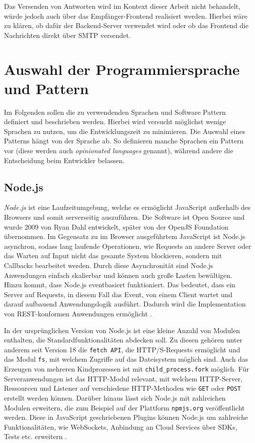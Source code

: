 Das Versenden von Antworten wird im Kontext dieser Arbeit nicht behandelt, würde jedoch auch über das Empfänger-Frontend realisiert werden. Hierbei wäre zu klären, ob dafür der Backend-Server verwendet wird oder ob das Frontend die Nachrichten direkt über SMTP versendet.


\section{Auswahl der Programmiersprache und Pattern}
\label{Auswahl_der_Technologie_und_Designpattern}

Im Folgenden sollen die zu verwendenden Sprachen und Software Pattern definiert und beschrieben werden. Hierbei wird versucht möglichst wenige Sprachen zu nutzen, um die Entwicklungszeit zu minimieren. Die Auswahl eines Patterns hängt von der Sprache ab. So definieren manche Sprachen ein Pattern vor (diese werden auch \textit{opinionated languages} genannt), während andere die Entscheidung beim Entwickler belassen.

\subsection{Node.js}
\label{Node.js}

\textit{Node.js} ist eine Laufzeitumgebung, welche es ermöglicht JavaScript außerhalb des Browsers und somit serverseitig auszuführen. Die Software ist Open Source und wurde 2009 von Ryan Dahl entwickelt, später von der OpenJS Foundation übernommen. Im Gegensatz zu im Browser ausgeführtem JavaScript ist Node.js asynchron, sodass lang laufende Operationen, wie Requests an andere Server oder das Warten auf Input nicht das gesamte System blockieren, sondern mit Callbacks bearbeitet werden. Durch diese Asynchronität sind Node.js Anwendungen einfach skalierbar und können auch große Lasten bewältigen. Hinzu kommt, dass Node.js eventbasiert funktioniert. Das bedeutet, dass ein Server auf Requests, in diesem Fall das Event, von einem Client wartet und darauf aufbauend Anwendungslogik ausführt. Dadurch wird die Implementation von REST-konformen Anwendungen ermöglicht \citep{OpenJSFoundation2022}.

In der ursprünglichen Version von Node.js ist eine kleine Anzahl von Modulen enthalten, die Standardfunktionalitäten abdecken soll. Zu diesen gehören unter anderem seit Version 18 die \texttt{fetch API}, die HTTP/S-Requests ermöglicht und das Modul \texttt{fs}, mit welchem Zugriffe auf das Dateisystem möglich sind. Auch das Erzeugen von mehreren Kindprozessen ist mit \texttt{child\_process.fork} möglich. Für Serveranwendungen ist das HTTP-Modul relevant, mit welchem HTTP-Server, Ressourcen und Listener auf verschiedene HTTP-Methoden wie \texttt{GET} oder \texttt{POST} erstellt werden können. Darüber hinaus lässt sich Node.js mit zahlreichen Modulen erweitern, die zum Beispiel auf der Plattform \texttt{npmjs.org} veröffentlicht werden. Diese in JavaScript geschriebenen Plugins können Node.js um zahlreiche Funktionalitäten, wie WebSockets, Anbindung an Cloud Services über SDKs, Tests etc. erweitern \citep{OpenJSFoundation2022a}.

